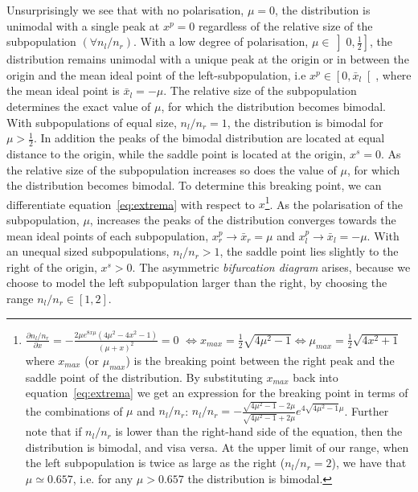 \documentclass[preprint, 12pt]{elsarticle}
\begin{document}
Unsurprisingly we see that with no polarisation, $\mu = 0$, the distribution is unimodal with a single peak at $x^p=0$ regardless of the relative size of the subpopulation $\left(\forall n_l/n_r\right)$. With a low degree of polarisation, $\mu \in \left]0,\frac{1}{2}\right]$, the distribution remains unimodal with a unique peak at the origin or in between the origin and the mean ideal point of the left-subpopulation, i.e $x^p \in \left[0,{\bar x_l}\right[$, where the mean ideal point is ${\bar x_l} = -\mu$. The relative size of the subpopulation determines the exact value of $\mu$, for which the distribution becomes bimodal. With subpopulations of equal size, $n_l/n_r=1$, the distribution is bimodal for $\mu > \frac{1}{2}$. In addition the peaks of the bimodal distribution are located at equal distance to the origin, while the saddle point is located at the origin, $x^s = 0$. As the relative size of the subpopulation increases so does the value of $\mu$, for which the distribution becomes bimodal. To determine this breaking point, we can differentiate equation~\ref{eq:extrema} with respect to $x$\footnote{$\frac{\partial n_l/n_r}{{\partial x}} = - \frac{2 \mu e^{8x\mu} \left(4\mu^2-4x^2-1\right)}{(\mu+x)^2} = 0$ $\Leftrightarrow x_{max} = \frac{1}{2} \sqrt{4{\mu}^2-1} \Leftrightarrow \mu_{max} = \frac{1}{2} \sqrt{4x^2+1}$ where $x_{max}$ (or $\mu_{max}$) is the breaking point between the right peak and the saddle point of the distribution. By substituting $x_{max}$ back into equation~\ref{eq:extrema} we get an expression for the breaking point in terms of the combinations of $\mu$ and $n_l/n_r$: $n_l/n_r = - \frac{\sqrt{4{\mu}^2-1} -2\mu}{\sqrt{4{\mu}^2-1} +2\mu} e^{4\sqrt{4{\mu}^2-1}\mu}$. Further note that if $n_l/n_r$ is lower than the right-hand side of the equation, then the distribution is bimodal, and visa versa. At the upper limit of our range, when the left subpopulation is twice as large as the right ($n_l/n_r=2$), we have that $\mu \simeq 0.657$, i.e. for any $\mu > 0.657$ the distribution is bimodal.}. As the polarisation of the subpopulation, $\mu$, increases the peaks of the distribution converges towards the mean ideal points of each subpopulation, $x^p_r \to {\bar x_r} = \mu$ and $x^p_l \to {\bar x_l} = -\mu$. With an unequal sized subpopulations, $n_l/n_r > 1$, the saddle point lies slightly to the right of the origin, $x^s > 0$. The asymmetric \emph{bifurcation diagram} arises, because we choose to model the left subpopulation larger than the right, by choosing the range $n_l/n_r \in [1,2]$.
\end{document}
